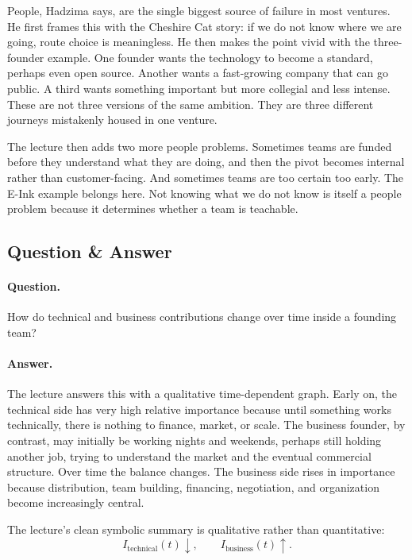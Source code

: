 People, Hadzima says, are the single biggest source of failure in most ventures. He first frames this with the Cheshire Cat story: if we do not know where we are going, route choice is meaningless. He then makes the point vivid with the three-founder example. One founder wants the technology to become a standard, perhaps even open source. Another wants a fast-growing company that can go public. A third wants something important but more collegial and less intense. These are not three versions of the same ambition. They are three different journeys mistakenly housed in one venture.

The lecture then adds two more people problems. Sometimes teams are funded before they understand what they are doing, and then the pivot becomes internal rather than customer-facing. And sometimes teams are too certain too early. The E-Ink example belongs here. Not knowing what we do not know is itself a people problem because it determines whether a team is teachable.

\subsection{Question \& Answer}

\paragraph{Question.} How do technical and business contributions change over time inside a founding team?

\paragraph{Answer.} The lecture answers this with a qualitative time-dependent graph. Early on, the technical side has very high relative importance because until something works technically, there is nothing to finance, market, or scale. The business founder, by contrast, may initially be working nights and weekends, perhaps still holding another job, trying to understand the market and the eventual commercial structure. Over time the balance changes. The business side rises in importance because distribution, team building, financing, negotiation, and organization become increasingly central.

The lecture's clean symbolic summary is qualitative rather than quantitative:
\begin{equation}
I_{\text{technical}}(t)\downarrow,\qquad I_{\text{business}}(t)\uparrow.
\end{equation}

